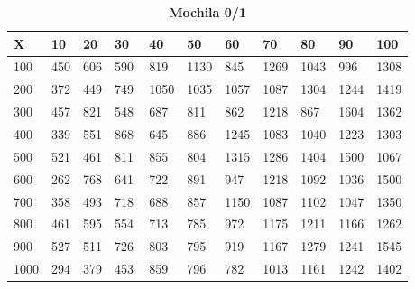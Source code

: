 \documentclass[10pt,letterpaper]{article}
\begin{document}
\newpage 
{}
\begin{center}
\begin{table}\renewcommand{\arraystretch}{2.5}
\caption{\large \textbf{Mochila 0/1}}
\centering
\begin{tabular} { |m{0.5cm}|m{1.3cm}|m{1.3cm}|m{1.3cm}|m{1.3cm}|m{1.3cm}|m{1.3cm}|m{1.3cm}|m{1.3cm}|m{1.3cm}|m{1.3cm}|} 
\hline
\rowcolor{Gray}
\centering \textbf{X} & \centering \textbf{10} & \centering \textbf{20} & \centering \textbf{30}\ & \centering \textbf{40} & \centering \textbf{50} & \centering \textbf{60}\ & \centering \textbf{70} & \centering \textbf{80} & \centering \textbf{90}\ & \textbf{100} \\\hline
\cellcolor{Gray}100 & \Large 450 & \Large 606 & \Large 590 & \Large 819 & \Large 1130 & \Large 845 & \Large 1269 & \Large 1043 & \Large 996 & \Large 1308 \\
\hline
\cellcolor{Gray}200 & \Large 372 & \Large 449 & \Large 749 & \Large 1050 & \Large 1035 & \Large 1057 & \Large 1087 & \Large 1304 & \Large 1244 & \Large 1419 \\
\hline
\cellcolor{Gray}300 & \Large 457 & \Large 821 & \Large 548 & \Large 687 & \Large 811 & \Large 862 & \Large 1218 & \Large 867 & \Large 1604 & \Large 1362 \\
\hline
\cellcolor{Gray}400 & \Large 339 & \Large 551 & \Large 868 & \Large 645 & \Large 886 & \Large 1245 & \Large 1083 & \Large 1040 & \Large 1223 & \Large 1303 \\
\hline
\cellcolor{Gray}500 & \Large 521 & \Large 461 & \Large 811 & \Large 855 & \Large 804 & \Large 1315 & \Large 1286 & \Large 1404 & \Large 1500 & \Large 1067 \\
\hline
\cellcolor{Gray}600 & \Large 262 & \Large 768 & \Large 641 & \Large 722 & \Large 891 & \Large 947 & \Large 1218 & \Large 1092 & \Large 1036 & \Large 1500 \\
\hline
\cellcolor{Gray}700 & \Large 358 & \Large 493 & \Large 718 & \Large 688 & \Large 857 & \Large 1150 & \Large 1087 & \Large 1102 & \Large 1047 & \Large 1350 \\
\hline
\cellcolor{Gray}800 & \Large 461 & \Large 595 & \Large 554 & \Large 713 & \Large 785 & \Large 972 & \Large 1175 & \Large 1211 & \Large 1166 & \Large 1262 \\
\hline
\cellcolor{Gray}900 & \Large 527 & \Large 511 & \Large 726 & \Large 803 & \Large 795 & \Large 919 & \Large 1167 & \Large 1279 & \Large 1241 & \Large 1545 \\
\hline
\cellcolor{Gray}1000 & \Large 294 & \Large 379 & \Large 453 & \Large 859 & \Large 796 & \Large 782 & \Large 1013 & \Large 1161 & \Large 1242 & \Large 1402 \\
\hline
\end{tabular} \\
\end{table}
\end{center}
\end{document}
